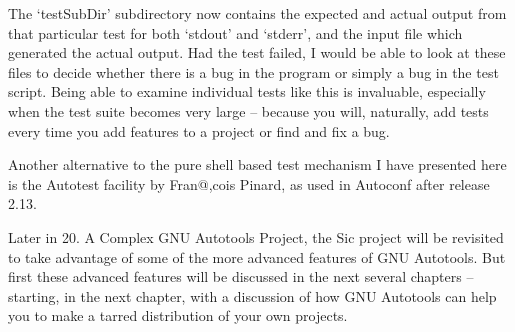 The `testSubDir' subdirectory now contains the expected and actual output from that particular test for both `stdout' and `stderr', and the input file which generated the actual output. Had the test failed, I would be able to look at these files to decide whether there is a bug in the program or simply a bug in the test script. Being able to examine individual tests like this is invaluable, especially when the test suite becomes very large -- because you will, naturally, add tests every time you add features to a project or find and fix a bug.

Another alternative to the pure shell based test mechanism I have presented here is the Autotest facility by Fran@,cois Pinard, as used in Autoconf after release 2.13.

Later in 20. A Complex GNU Autotools Project, the Sic project will be revisited to take advantage of some of the more advanced features of GNU Autotools. But first these advanced features will be discussed in the next several chapters -- starting, in the next chapter, with a discussion of how GNU Autotools can help you to make a tarred distribution of your own projects. 

